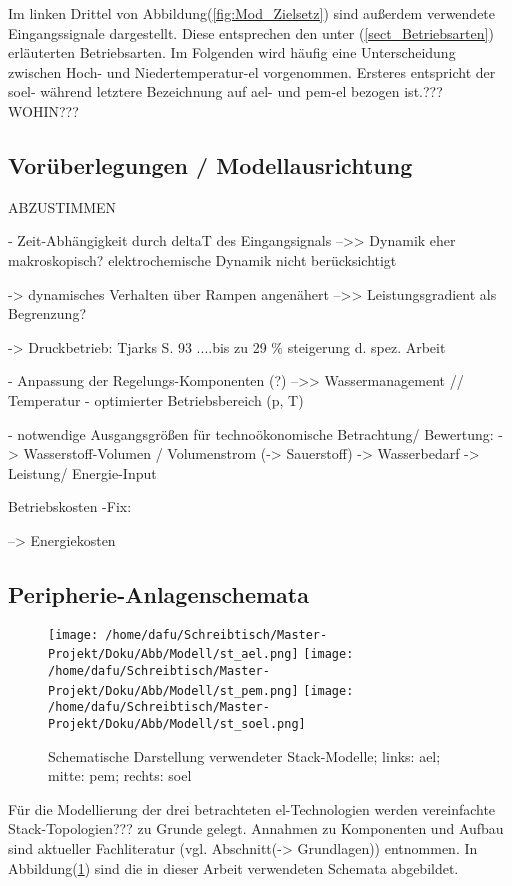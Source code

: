 \documentclass[onecolumn,10pt,titlepage]{article}
\begin{document}
Im linken Drittel von Abbildung(\ref{fig:Mod_Zielsetz}) sind außerdem verwendete Eingangssignale dargestellt. Diese entsprechen den unter (\ref{sect_Betriebsarten}) erläuterten Betriebsarten. 
Im Folgenden wird häufig eine Unterscheidung zwischen Hoch- und Niedertemperatur-\gls{el} vorgenommen. Ersteres entspricht der \gls{soel}- während letztere Bezeichnung auf \gls{ael}- und \gls{pem}-\gls{el} bezogen ist.???WOHIN???
\subsection{Vorüberlegungen / Modellausrichtung}
ABZUSTIMMEN

- Zeit-Abhängigkeit durch deltaT des Eingangsignals
-->> Dynamik eher makroskopisch?
elektrochemische Dynamik nicht berücksichtigt

-> dynamisches Verhalten über Rampen angenähert
-->> Leistungsgradient als Begrenzung?

-> Druckbetrieb: Tjarks S. 93 ....bis zu 29 \% steigerung d. spez. Arbeit 

- Anpassung der Regelungs-Komponenten (?) -->> Wassermanagement // Temperatur
- optimierter Betriebsbereich (p, T)

- notwendige Ausgangsgrößen für technoökonomische Betrachtung/ Bewertung:
-> Wasserstoff-Volumen / Volumenstrom
(-> Sauerstoff)
-> Wasserbedarf
-> Leistung/ Energie-Input

Betriebskosten
-Fix:

--> Energiekosten




\subsection{Peripherie-Anlagenschemata}
\label{subs_peri_schem}

\begin{figure}[H]
	
	\centering
	\texttt{[image: /home/dafu/Schreibtisch/Master-Projekt/Doku/Abb/Modell/st\_ael.png]}
	\texttt{[image: /home/dafu/Schreibtisch/Master-Projekt/Doku/Abb/Modell/st\_pem.png]}
	\texttt{[image: /home/dafu/Schreibtisch/Master-Projekt/Doku/Abb/Modell/st\_soel.png]}
	\caption{Schematische Darstellung verwendeter Stack-Modelle; links: \gls{ael}; mitte: \gls{pem}; rechts: \gls{soel} }
	\label{fig:peri_schem_Modell} 
\end{figure}
Für die Modellierung der drei betrachteten \gls{el}-Technologien werden vereinfachte Stack-Topologien??? zu Grunde gelegt. Annahmen zu Komponenten und Aufbau sind aktueller Fachliteratur (vgl. Abschnitt(-> Grundlagen)) entnommen. In Abbildung(\ref{fig:peri_schem_Modell}) sind die in dieser Arbeit verwendeten Schemata abgebildet.\\
\end{document}

